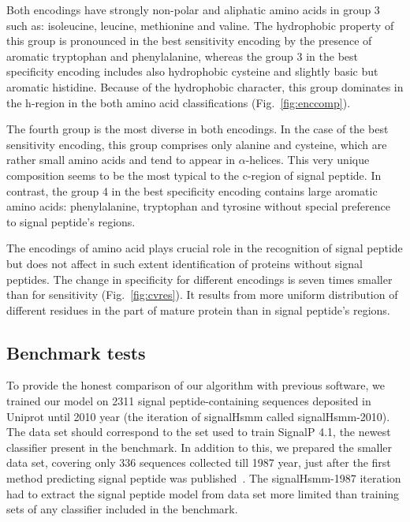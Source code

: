 \documentclass[10pt,letterpaper]{article}
\begin{document}
Both encodings have strongly non-polar and aliphatic amino acids in group 3 such as: isoleucine, leucine, methionine and valine. The hydrophobic property of this group is  pronounced in the best sensitivity encoding by the presence of aromatic tryptophan and phenylalanine, whereas the group 3 in the best specificity encoding includes also hydrophobic cysteine and slightly basic but aromatic histidine. Because of the hydrophobic character, this group dominates in the h-region in the both amino acid classifications (Fig.~\ref{fig:enccomp}).

The fourth group is the most diverse in both encodings. In the case of the best sensitivity encoding, this group comprises only alanine and cysteine, which are rather small amino acids and tend to appear in $\alpha$-helices. This very unique composition seems to be the most typical to the c-region of signal peptide. In contrast, the group 4 in the best specificity encoding contains large aromatic amino acids: phenylalanine, tryptophan and tyrosine without special preference to signal peptide's regions.  

The encodings of amino acid plays crucial role in the recognition of signal peptide but does not affect in such extent identification of proteins without signal peptides. The change in specificity for different encodings is seven times smaller than for sensitivity (Fig.~\ref{fig:cvres}). It results from more uniform distribution of different residues in the part of mature protein than in signal peptide's regions.

\subsection*{Benchmark tests}

To provide the honest comparison of our algorithm with previous software, we trained our model on 2311 signal peptide-containing sequences deposited in Uniprot until 2010 year (the iteration of signalHsmm called signalHsmm-2010). The data set should correspond to the set used to train SignalP 4.1, the newest classifier present in the benchmark. In addition to this, we prepared the smaller data set, covering only 336 sequences collected till 1987 year, just after the first method predicting signal peptide was published~\cite{1986vonheijnea}. The signalHsmm-1987 iteration had to extract the signal peptide model from data set more limited than training sets of any classifier included in the benchmark.
\end{document}
